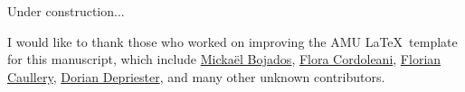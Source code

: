 Under construction...

I would like to thank those who worked on improving the AMU \LaTeX\ template for this manuscript, 
which include 
\href{http://www.theses.fr/2011AIX20720}{Mickaël Bojados}, 
\href{http://www.theses.fr/2011AIX22111}{Flora Cordoleani}, 
\href{http://www.theses.fr/2014AIXM4013}{Florian Caullery}, 
\href{http://theses.fr/2014ENMP0038}{Dorian Depriester}, 
and many other unknown contributors. 

